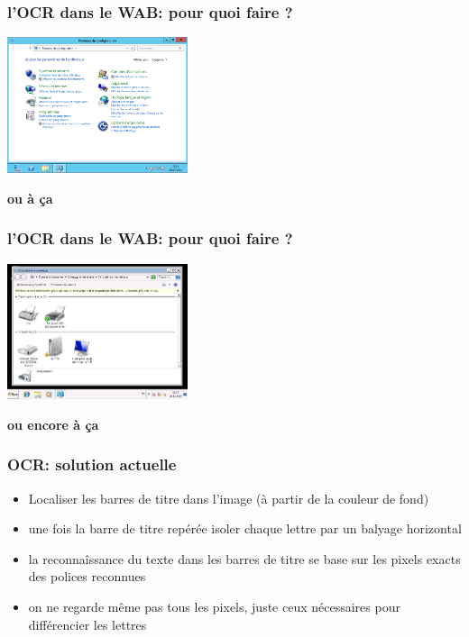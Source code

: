 \documentclass[xcolor=dvipsnames]{beamer}
\begin{document}
\begin{frame}
\frametitle{l'OCR dans le WAB: pour quoi faire ?}
    \begin{center}
       \includegraphics[width=200px]{TBar1.png}
      \begin{alertblock}{}
            \begin{center}
                  \textbf{\Large ou à ça}
            \end{center}
      \end{alertblock}
    \end{center}
\end{frame}

\begin{frame}
\frametitle{l'OCR dans le WAB: pour quoi faire ?}
    \begin{center}
       \includegraphics[width=200px]{TBar3.png}
      \begin{alertblock}{}
            \begin{center}
                  \textbf{\Large ou encore à ça}
            \end{center}
      \end{alertblock}
    \end{center}
\end{frame}

\begin{frame}
\frametitle{OCR: solution actuelle}
    \begin{itemize}
    \item Localiser les barres de titre dans l'image (à partir de la couleur de fond)\pause
    \item une fois la barre de titre repérée isoler chaque lettre par un balyage horizontal\pause
    \item la reconnaîssance du texte dans les barres de titre se base sur les pixels exacts des polices reconnues\pause
    \item on ne regarde même pas tous les pixels, juste ceux nécessaires pour différencier les lettres
    \end{itemize}
\end{frame}
\end{document}
